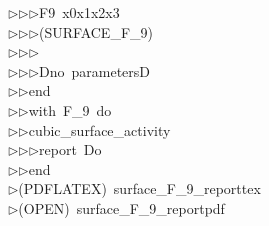 \begin{tabbing}
$\triangleright$\>$\triangleright$\>$\triangleright$\>F9\ x0x1x2x3\ \\[0pt]
$\triangleright$\>$\triangleright$\>$\triangleright$\>(SURFACE\_F\_9)\ \\[0pt]
$\triangleright$\>$\triangleright$\>$\triangleright$\>\ \\[0pt]
$\triangleright$\>$\triangleright$\>$\triangleright$\>Dno\ parametersD\ \ \\[0pt]
$\triangleright$\>$\triangleright$\>end\ \\[0pt]
$\triangleright$\>$\triangleright$\>with\ F\_9\ do\ \\[0pt]
$\triangleright$\>$\triangleright$\>cubic\_surface\_activity\ \\[0pt]
$\triangleright$\>$\triangleright$\>$\triangleright$\>report\ Do\ \\[0pt]
$\triangleright$\>$\triangleright$\>end\\[0pt]
$\triangleright$\>(PDFLATEX)\ surface\_F\_9\_reporttex\\[0pt]
$\triangleright$\>(OPEN)\ surface\_F\_9\_reportpdf\\[0pt]
\end{tabbing}
